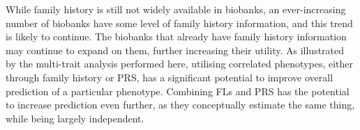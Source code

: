 While family history is still not widely available in biobanks, an ever-increasing number of biobanks have some level of family history information, and this trend is likely to continue. The biobanks that already have family history information may continue to expand on them, further increasing their utility. As illustrated by the multi-trait analysis performed here, utilising correlated phenotypes, either through family history or PRS, has a significant potential to improve overall prediction of a particular phenotype. Combining FLs and PRS has the potential to increase prediction even further, as they conceptually estimate the same thing, while being largely independent.
